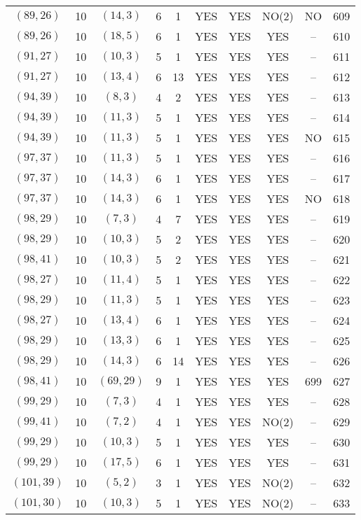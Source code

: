 \begin{longtable}{|c|c|c|c|c|c|c|c|c|c|}
$(89, 26)$ & 10 & $(14, 3)$ & 6 & 1 & YES & YES & NO(2) & NO & 609\\
$(89, 26)$ & 10 & $(18, 5)$ & 6 & 1 & YES & YES & YES & -- & 610\\
$(91, 27)$ & 10 & $(10, 3)$ & 5 & 1 & YES & YES & YES & -- & 611\\
$(91, 27)$ & 10 & $(13, 4)$ & 6 & 13 & YES & YES & YES & -- & 612\\
$(94, 39)$ & 10 & $(8, 3)$ & 4 & 2 & YES & YES & YES & -- & 613\\
$(94, 39)$ & 10 & $(11, 3)$ & 5 & 1 & YES & YES & YES & -- & 614\\
$(94, 39)$ & 10 & $(11, 3)$ & 5 & 1 & YES & YES & YES & NO & 615\\
$(97, 37)$ & 10 & $(11, 3)$ & 5 & 1 & YES & YES & YES & -- & 616\\
$(97, 37)$ & 10 & $(14, 3)$ & 6 & 1 & YES & YES & YES & -- & 617\\
$(97, 37)$ & 10 & $(14, 3)$ & 6 & 1 & YES & YES & YES & NO & 618\\
$(98, 29)$ & 10 & $(7, 3)$ & 4 & 7 & YES & YES & YES & -- & 619\\
$(98, 29)$ & 10 & $(10, 3)$ & 5 & 2 & YES & YES & YES & -- & 620\\
$(98, 41)$ & 10 & $(10, 3)$ & 5 & 2 & YES & YES & YES & -- & 621\\
$(98, 27)$ & 10 & $(11, 4)$ & 5 & 1 & YES & YES & YES & -- & 622\\
$(98, 29)$ & 10 & $(11, 3)$ & 5 & 1 & YES & YES & YES & -- & 623\\
$(98, 27)$ & 10 & $(13, 4)$ & 6 & 1 & YES & YES & YES & -- & 624\\
$(98, 29)$ & 10 & $(13, 3)$ & 6 & 1 & YES & YES & YES & -- & 625\\
$(98, 29)$ & 10 & $(14, 3)$ & 6 & 14 & YES & YES & YES & -- & 626\\
$(98, 41)$ & 10 & $(69, 29)$ & 9 & 1 & YES & YES & YES & 699 & 627\\
$(99, 29)$ & 10 & $(7, 3)$ & 4 & 1 & YES & YES & YES & -- & 628\\
$(99, 41)$ & 10 & $(7, 2)$ & 4 & 1 & YES & YES & NO(2) & -- & 629\\
$(99, 29)$ & 10 & $(10, 3)$ & 5 & 1 & YES & YES & YES & -- & 630\\
$(99, 29)$ & 10 & $(17, 5)$ & 6 & 1 & YES & YES & YES & -- & 631\\
$(101, 39)$ & 10 & $(5, 2)$ & 3 & 1 & YES & YES & NO(2) & -- & 632\\
$(101, 30)$ & 10 & $(10, 3)$ & 5 & 1 & YES & YES & NO(2) & -- & 633\\

\end{longtable}

